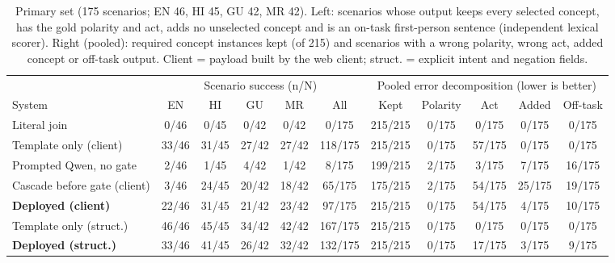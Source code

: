 \begin{table}[t]\centering\footnotesize\setlength{\tabcolsep}{2.6pt}
\begin{tabular}{@{}p{3.5cm}ccccc@{\hspace{8pt}}ccccc@{}}
\toprule
 & \multicolumn{5}{c}{Scenario success (n/N)} & \multicolumn{5}{c}{Pooled error decomposition (lower is better)} \\
\cmidrule(lr){2-6}\cmidrule(lr){7-11}
System & EN & HI & GU & MR & All & Kept & Polarity & Act & Added & Off-task \\
\midrule
Literal join & 0/46 & 0/45 & 0/42 & 0/42 & 0/175 & 215/215 & 0/175 & 0/175 & 0/175 & 0/175 \\
Template only (client) & 33/46 & 31/45 & 27/42 & 27/42 & 118/175 & 215/215 & 0/175 & 57/175 & 0/175 & 0/175 \\
Prompted Qwen, no gate & 2/46 & 1/45 & 4/42 & 1/42 & 8/175 & 199/215 & 2/175 & 3/175 & 7/175 & 16/175 \\
Cascade before gate (client) & 3/46 & 24/45 & 20/42 & 18/42 & 65/175 & 175/215 & 2/175 & 54/175 & 25/175 & 19/175 \\
\textbf{Deployed (client)} & 22/46 & 31/45 & 21/42 & 23/42 & 97/175 & 215/215 & 0/175 & 54/175 & 4/175 & 10/175 \\
\midrule
Template only (struct.) & 46/46 & 45/45 & 34/42 & 42/42 & 167/175 & 215/215 & 0/175 & 0/175 & 0/175 & 0/175 \\
\textbf{Deployed (struct.)} & 33/46 & 41/45 & 26/42 & 32/42 & 132/175 & 215/215 & 0/175 & 17/175 & 3/175 & 9/175 \\
\bottomrule
\end{tabular}
\caption{Primary set (175 scenarios; EN 46, HI 45, GU 42, MR 42). Left: scenarios whose output keeps every selected concept, has the gold polarity and act, adds no unselected concept and is an on-task first-person sentence (independent lexical scorer). Right (pooled): required concept instances kept (of 215) and scenarios with a wrong polarity, wrong act, added concept or off-task output. Client = payload built by the web client; struct. = explicit intent and negation fields.}
\label{tab:results}
\end{table}
